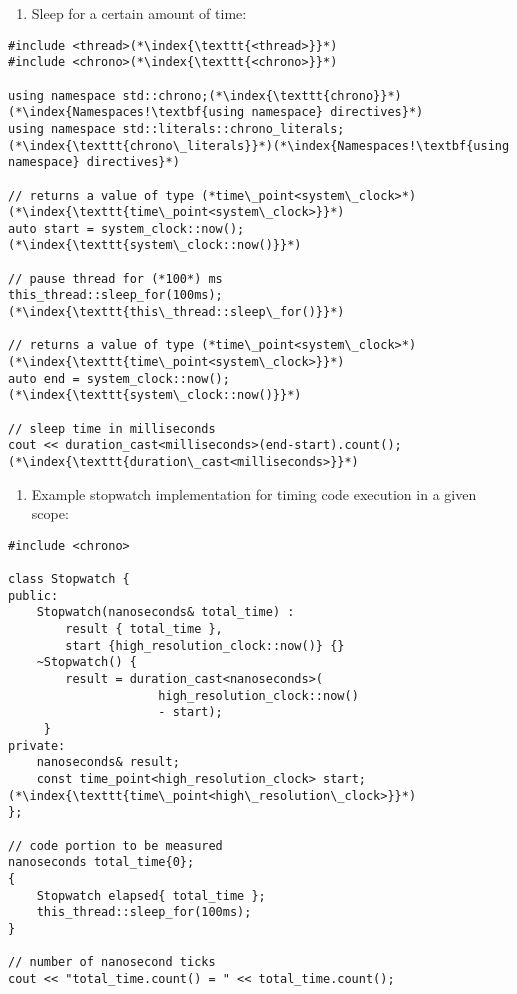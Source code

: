 \documentclass[10pt]{book}
\begin{document}
\begin{enumerate}
\item[] Sleep for a certain amount of time:
\end{enumerate}
\begin{lstlisting}
#include <thread>(*\index{\texttt{<thread>}}*)
#include <chrono>(*\index{\texttt{<chrono>}}*)

using namespace std::chrono;(*\index{\texttt{chrono}}*)(*\index{Namespaces!\textbf{using namespace} directives}*)
using namespace std::literals::chrono_literals;(*\index{\texttt{chrono\_literals}}*)(*\index{Namespaces!\textbf{using namespace} directives}*)

// returns a value of type (*time\_point<system\_clock>*)(*\index{\texttt{time\_point<system\_clock>}}*)
auto start = system_clock::now();(*\index{\texttt{system\_clock::now()}}*)

// pause thread for (*100*) ms
this_thread::sleep_for(100ms);(*\index{\texttt{this\_thread::sleep\_for()}}*)

// returns a value of type (*time\_point<system\_clock>*)(*\index{\texttt{time\_point<system\_clock>}}*)
auto end = system_clock::now();(*\index{\texttt{system\_clock::now()}}*)

// sleep time in milliseconds
cout << duration_cast<milliseconds>(end-start).count();(*\index{\texttt{duration\_cast<milliseconds>}}*)
\end{lstlisting}
\begin{enumerate}
\item[] Example stopwatch implementation for timing code execution in a given scope:
\end{enumerate}
\begin{lstlisting}
#include <chrono>

class Stopwatch {
public:
    Stopwatch(nanoseconds& total_time) : 
        result { total_time },
        start {high_resolution_clock::now()} {}
    ~Stopwatch() {
        result = duration_cast<nanoseconds>(
                     high_resolution_clock::now()
                     - start);
     }
private:
    nanoseconds& result;
    const time_point<high_resolution_clock> start;(*\index{\texttt{time\_point<high\_resolution\_clock>}}*)
};

// code portion to be measured
nanoseconds total_time{0};
{
    Stopwatch elapsed{ total_time };
    this_thread::sleep_for(100ms);
}

// number of nanosecond ticks
cout << "total_time.count() = " << total_time.count();
\end{lstlisting}
\end{document}
